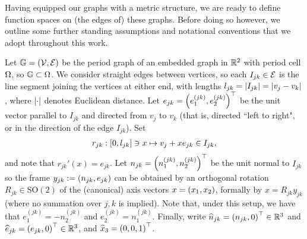 Having equipped our graphs with a metric structure, we are ready to define function spaces on (the edges of) these graphs.
Before doing so however, we outline some further standing assumptions and notational conventions that we adopt throughout this work.
\begin{assumption} \label{ass:MeasTheoryProblemSetup}
	Let $\mathbb{G}=\left( \mathcal{V},\mathcal{E} \right)$ be the period graph of an embedded graph in $\mathbb{R}^2$ with period cell $\Omega$, so $\mathbb{G}\subset\Omega$.
	We consider straight edges between vertices, so each $I_{jk}\in \mathcal{E}$ is the line segment joining the vertices at either end, with lengths $l_{jk} = \left\lvert I_{jk} \right\rvert = \left\lvert v_j-v_k \right\rvert$, where $\left\lvert \cdot \right\rvert$ denotes Euclidean distance.
	Let $e_{jk} = \left( e_1^{(jk)}, e_2^{(jk)} \right)^\top$ be the unit vector parallel to $I_{jk}$ and directed from $v_j$ to $v_k$ (that is, directed ``left to right", or in the direction of the edge $I_{jk}$).
	Set
	\begin{align} \label{eq:EdgeParameterisation}
		r_{jk}:\left[ 0, l_{jk} \right] \ni x \mapsto v_j + xe_{jk} \in I_{jk},
	\end{align}
	and note that $r_{jk}'(x) = e_{jk}$.
	Let $n_{jk} = \left( n_1^{(jk)}, n_2^{(jk)} \right)^\top$ be the unit normal to $I_{jk}$ so the frame $y_{jk} := \left( n_{jk}, e_{jk} \right)$ can be obtained by an orthogonal rotation $R_{jk}\in\mathrm{SO}(2)$ of the (canonical) axis vectors $x = \left( x_1, x_2 \right)$, formally by $x = R_{jk}y_{jk}$ (where no summation over $j,k$ is implied).
	Note that, under this setup, we have that $e_1^{(jk)} = - n_2^{(jk)}$ and $e_2^{(jk)} = n_1^{(jk)}$.
	Finally, write $\widehat{n}_{jk} = \left(  n_{jk}, 0  \right)^\top\in\mathbb{R}^3$ and $\widehat{e}_{jk} = \left(  e_{jk}, 0  \right)^\top\in\mathbb{R}^3$, and $\widehat{x}_3 = \left( 0,0,1 \right)^\top$.
\end{assumption}

